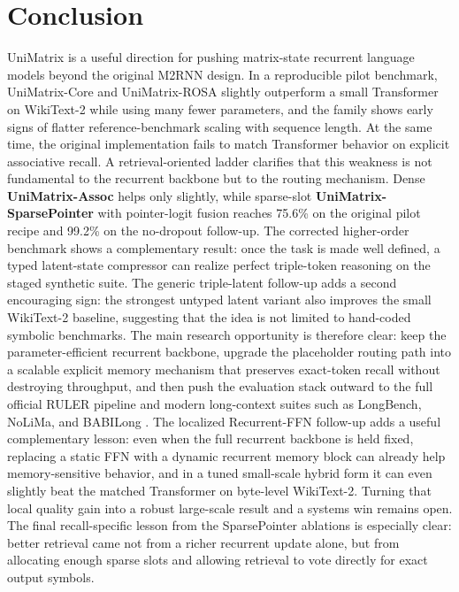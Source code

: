 \documentclass[11pt]{article}
\begin{document}
\section{Conclusion}
UniMatrix is a useful direction for pushing matrix-state recurrent language
models beyond the original M2RNN design. In a reproducible pilot benchmark,
UniMatrix-Core and UniMatrix-ROSA slightly outperform a small Transformer on
WikiText-2 while using many fewer parameters, and the family shows early signs
of flatter reference-benchmark scaling with sequence length. At the same time,
the original implementation fails to match Transformer behavior on explicit
associative recall. A retrieval-oriented ladder clarifies that this weakness is
not fundamental to the recurrent backbone but to the routing mechanism. Dense
\textbf{UniMatrix-Assoc} helps only slightly, while sparse-slot
\textbf{UniMatrix-SparsePointer} with pointer-logit fusion reaches 75.6\% on
the original pilot recipe and 99.2\% on the no-dropout follow-up. The
corrected higher-order benchmark shows a complementary result: once the task is
made well defined, a typed latent-state compressor can realize perfect
triple-token reasoning on the staged synthetic suite. The generic
triple-latent follow-up adds a second encouraging sign: the strongest untyped
latent variant also improves the small WikiText-2 baseline, suggesting that
the idea is not limited to hand-coded symbolic benchmarks. The main research
opportunity is therefore clear: keep the parameter-efficient recurrent
backbone, upgrade the placeholder routing path into a scalable explicit memory
mechanism that preserves exact-token recall without destroying throughput, and
then push the evaluation stack outward to the full official RULER pipeline and
modern long-context suites such as LongBench, NoLiMa, and BABILong
\citep{hsieh2024ruler,longbench2023,nolima2025,babilong2024}. The localized
Recurrent-FFN follow-up adds a useful complementary lesson: even when the full
recurrent backbone is held fixed, replacing a static FFN with a dynamic
recurrent memory block can already help memory-sensitive behavior, and in a
tuned small-scale hybrid form it can even slightly beat the matched
Transformer on byte-level WikiText-2. Turning that local quality gain into a
robust large-scale result and a systems win remains open. The final
recall-specific lesson from the SparsePointer ablations is especially clear:
better retrieval came not from a richer recurrent update alone, but from
allocating enough sparse slots and allowing retrieval to vote directly for
exact output symbols.



\end{document}
